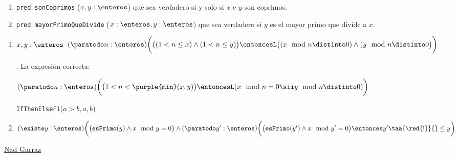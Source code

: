 \begin{enunciado}{\ejercicio}
  \begin{enumerate}[label=\alph*)]
    \item  \texttt{pred sonCoprimos} ($x,y:\enteros$) que sea verdadero si y solo si $x$ e $y$ son coprimos.
    \item  \texttt{pred mayorPrimoQueDivide} ($x:\enteros, y:\enteros$) que sea verdadero si $y$ es el mayor
          primo que divide a $x$.
  \end{enumerate}
\end{enunciado}

\begin{enumerate}[label=\alph*)]
  \item
        {$x,y: \enteros$}
        {$
            (\paratodo n : \enteros) \biggl( \bigl( (1 < n \leq x) \land (1 < n \leq y)\bigr)
            \entoncesL
            \bigl( (x\mod n \distinto 0) \land (y \mod n \distinto 0 \bigr)\biggr)
          $ }\par
        .
        La expresión correcta:\par
        { $
            (\paratodo n : \enteros)
            \biggl(
            \bigl(
            1< n < \texttt{\purple{mín}}(x, y)
            \bigr)
            \entoncesL
            (x \mod n = 0 \sii y \mod n \distinto 0)
            \biggr)
          $
        }

        {\texttt{IfThenElseFi}($a > b,a,b$)}

  \item
        {
          $
            (\existe y : \enteros)
            \biggl( \bigl( \texttt{esPrimo}(y) \land x \mod y = 0
            \bigr)
            \land
            (\paratodo y' : \enteros)
            \biggl(
            \bigl( \texttt{esPrimo}(y') \land x \mod y' = 0 \bigr)
            \entonces
            y' \taa{\red{!}}{}\leq y
            \biggr)
          $
        }

\end{enumerate}

\begin{aportes}
  \item \href{\dirRepo}{Nad Garraz \github}
\end{aportes}
